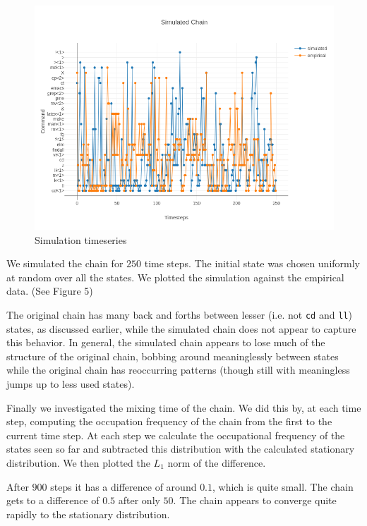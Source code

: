 \documentclass[10pt]{article}
\begin{document}
\begin{figure}[!htb]
  \centering
  \includegraphics[scale=.45]{../pictures/simul-chain-vs-empirical-chain.png}
  \caption{Simulation timeseries}
\end{figure}

We simulated the chain for $250$ time steps. The initial state was chosen
uniformly at random over all the states. We plotted the simulation against the
empirical data. (See Figure 5)

The original chain has many back and forths between lesser (i.e. not \texttt{cd}
and \texttt{ll}) states, as discussed earlier, while the simulated chain does
not appear to capture this behavior. In general, the simulated chain appears to
lose much of the structure of the original chain, bobbing around meaninglessly
between states while the original chain has reoccurring patterns (though still
with meaningless jumps up to less used states).

Finally we investigated the mixing time of the chain. We did this by, at each
time step, computing the occupation frequency of the chain from the first to the
current time step. At each step we calculate the occupational frequency of the
states seen so far and subtracted this distribution with the calculated
stationary distribution. We then plotted the $L_1$ norm of the difference.

After $900$ steps it has a difference of around $0.1$, which is quite small. The
chain gets to a difference of $0.5$ after only $50$. The chain appears to
converge quite rapidly to the stationary distribution.
\end{document}
